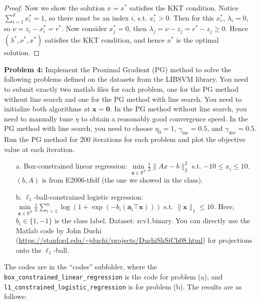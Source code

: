 \documentclass{article}
\newcommand{\bx}{{\mathbf x}}
\newcommand{\ba}{{\mathbf a}}
\begin{document}
\begin{enumerate}
\begin{proof}
Now we show the solution $x = x^* $ satisfies the KKT condition. Notice $\sum_{i=1}^{d}x_i^* = 1 $, so there must be an index $i$, s.t. $x_i^* > 0 $. Then for this $x_i^* $, $\lambda_i = 0 $, so $\nu = z_i - x_i^* = r^* $. Now consider $x_j^* = 0 $, then $\lambda_j = \nu - z_j = r^* - z_j \ge 0 $. Hence $(\lambda^*, \nu^*, x^*)$ satisfies the KKT condition, and hence $x^* $ is the optimal solution.

\end{proof}

\end{enumerate}
\bigskip

\noindent\textbf{Problem 4:} Implement the Proximal Gradient (PG) method to solve the following problems defined on the datasets from the LIBSVM library. You need to submit exactly two matlab files for each problem, one for the PG method without line search and one for the PG method with line search.
You need to initialize both algorithms at $\bx=\mathbf{0}$. In the PG method without line search, you need to manually tune $\eta$ to obtain a reasonably good convergence speed. In the PG method with line search, you need to choose $\eta_0=1$, $\gamma_{\text{inc}}=0.5$, and $\gamma_{\text{dec}}=0.5$. Run the PG method for 200 iterations for each problem and plot the objective value at each iteration. 
\begin{enumerate}
\item[a.] Box-constrained linear regression: $\min\limits_{\bx\in\mathbb{R}^d} \frac{1}{2}\|Ax-b\|_2^2$ s.t. $-10\leq x_i\leq 10$. $(b,A)$ is from E2006-tfidf (the one we showed in the class).
\item[b.] $\ell_1$-ball-constrained logistic regression: $\min\limits_{\bx\in\mathbb{R}^d} \frac{1}{n}\sum_{i=1}^n\log(1+\exp(-b_i(\ba_i\top\bx)))$ s.t. $\|\bx\|_1\leq 10$. Here, $b_i\in\{1,-1\}$ is the class label. Dataset: rcv1.binary. You can directly use the Matlab code by John Duchi (\url{https://stanford.edu/~jduchi/projects/DuchiShSiCh08.html}) for projections onto the $\ell_1$-ball. 
\end{enumerate}

The codes are in the ``codes'' subfolder, where the \texttt{box\_constrained\_linear\_regression} is the code for problem (a), and \texttt{l1\_constrained\_logistic\_regression} is for problem (b). The results are as follows:
\end{document}
